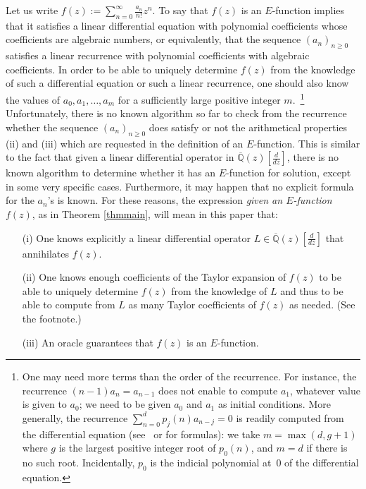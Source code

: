 \documentclass[reqno,english,12pt,a4paper]{smfart}
\numberwithin{equation}{section}
\def\Qbar{\overline{\mathbb Q}}
\begin{document}
Let us write $f(z):=\sum_{n=0}^\infty \frac{a_n}{n!}z^n$. To say that $f(z)$ is an $E$-function implies that it satisfies a linear differential equation with polynomial coefficients whose coefficients are algebraic numbers, or equivalently, that the sequence $(a_n)_{n\ge 0}$ satisfies a linear recurrence with polynomial coefficients with algebraic coefficients. In order to be able to uniquely determine $f(z)$ from the knowledge of such a differential equation or such a linear recurrence, one should also know the values of $a_0,a_1,\ldots,a_m$ for a sufficiently large positive integer $m$.~\footnote{One may need more terms than the order of the recurrence. For instance, the recurrence $(n-1)a_{n}=a_{n-1}$ does not enable to compute $a_1$, whatever value is given to $a_0$; we need to be given $a_0$ and $a_1$ as initial conditions. More generally, the recurrence $\sum_{n=0}^d p_j(n)a_{n-j}=0$   is readily computed from the differential equation (see~\cite[p. 504]{bvs} or \cite[proof of Lemma 2]{gfndio} for formulas): we take  $m=\max(d,g+1)$  where $g$ is the largest positive integer root of $p_0(n)$, and $m=d$ if there is no such root.   Incidentally,  $p_0$ is the indicial polynomial 
at~$0$ of the differential equation.} 
Unfortunately, there is no known algorithm so far to check from the recurrence whether  the sequence 
$(a_n)_{n\ge 0}$ does satisfy or not  the arithmetical properties (ii) and (iii) which are requested in the definition of an $E$-function. This is similar to the fact that given a linear differential operator  in $\Qbar(z)[\frac{d}{dz}]$, there is no known algorithm  to determine whether it has an $E$-function for solution, except in some 
very specific cases.  
Furthermore, it may happen that no explicit formula for the $a_n$'s is known. For these reasons, the expression \emph{given an $E$-function $f(z)$}, as in Theorem \ref{thmmain}, will mean in this paper that:
\begin{enumerate}
\item[(i)] One knows explicitly a linear differential operator $L\in \Qbar(z)[\frac{d}{dz}]$ that annihilates $f(z)$.
\item[(ii)] One knows enough coefficients of the Taylor expansion of $f(z)$ to be able to uniquely determine $f(z)$ from the knowledge of $L$ and thus to be able to compute from $L$ as many Taylor coefficients of 
$f(z)$ as needed. (See the footnote.)
\item[(iii)] An oracle guarantees that $f(z)$ is an $E$-function. 
\end{enumerate}
\end{document}
